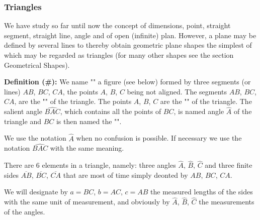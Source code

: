 	\pagebreak
	\subsubsection{Triangles}
	We have study so far until now the concept of dimensions, point, straight segment, straight line, angle and of open (infinite) plan. However, a plane may be defined by several lines to thereby obtain geometric plane shapes  the simplest of which may be regarded as triangles (for many other shapes see the section Geometrical Shapes).

	\textbf{Definition (\#\mydef):} We name "" a figure (see below) formed by three segments (or lines) $AB$, $BC$, $CA$, the points $A$, $B$, $C$ being not aligned. The segments $AB$, $BC$, $CA$, are the "" of the triangle. The points $A$, $B$, $C$ are the "" of the triangle. The salient angle $\widehat{BAC}$, which contains all the points of $BC$, is named angle $\hat{A}$ of the triangle and $BC$ is then named the "".
	
	\begin{tcolorbox}[title=Remark,colframe=black,arc=10pt]
	We use the notation $\hat{A}$ when no confusion is possible. If necessary we use the notation $\widehat{BAC}$ with the same meaning.
	\end{tcolorbox}
	There are $6$ elements in a triangle, namely: three angles $\hat{A}$,  $\hat{B}$,  $\hat{C}$ and three finite sides $\overline{AB}$, $\overline{BC}$, $\overline{CA}$ that are most of time simply deonted by $AB$, $BC$, $CA$.

	We will designate by $a=BC$, $b=AC$, $c=AB$ the measured lengths of the sides with the same unit of measurement, and obviously by $\hat{A}$,  $\hat{B}$,  $\hat{C}$ the measurements of the angles.

